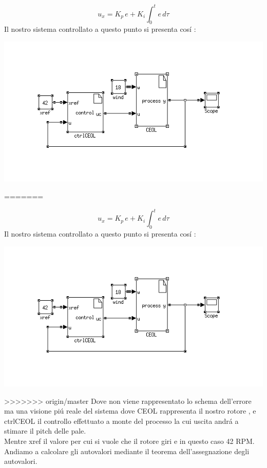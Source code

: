 \documentclass[a4paper,13pt]{article}
\begin{document}
	
\begin{equation*}
	u_x=K_{p}\,e+K_{i}\int_{0}^{t} e \, d\tau              %
\end{equation*}	
Il nostro sistema controllato a questo punto si presenta cos\'i :

\begin{center}
\includegraphics[scale=0.6]{eolcont.png}
\end{center}

=======

	
\begin{equation*}
	u_x=K_{p}\,e+K_{i}\int_{0}^{t} e \, d\tau              %
\end{equation*}	
Il nostro sistema controllato a questo punto si presenta cos\'i :

\begin{center}
\includegraphics[scale=0.6]{eolcont.png}
\end{center}

>>>>>>> origin/master
Dove non viene rappresentato lo schema dell'errore ma una visione pi\'u reale del sistema
dove CEOL rappresenta il nostro rotore , e ctrlCEOL il controllo effettuato a monte del processo la cui uscita andr\'a a stimare il pitch delle pale.\\
Mentre xref il valore per cui si vuole che il rotore giri e in questo caso 42 RPM.
Andiamo a calcolare gli autovalori mediante il teorema dell'assegnazione degli autovalori.
\end{document}
